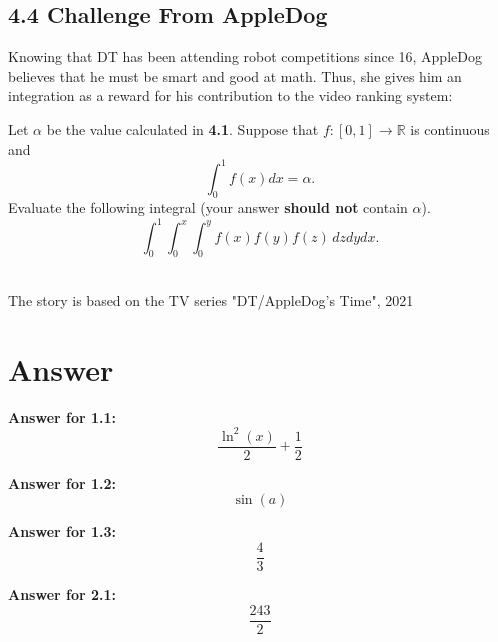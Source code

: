 \documentclass[12pt]{article}
\renewcommand{\emph}[1]{{\color{Turquoise3}\textsl{#1}}}
\begin{document}
\subsection*{4.4 Challenge From AppleDog}
\par Knowing that DT has been attending robot competitions since 16, AppleDog believes that he must be smart and good at math. Thus, she gives him an integration as a reward for his contribution to the video ranking system: 
\par Let \emph{$\alpha$} be the value calculated in \textbf{4.1}. Suppose that $f:[0,1] \to \mathbb{R}$ is continuous and 
\begin{equation*}
    \int_0^1 f(x) dx = \alpha. 
\end{equation*}
Evaluate the following integral (your answer \textbf{should not} contain \emph{$\alpha$}). 
\begin{equation*}
    \int_0^1 \int_0^x \int_0^y f(x)f(y)f(z)\,dzdydx. 
\end{equation*} 
~\\ 

\begin{flushright}
    The story is based on the TV series "DT/AppleDog's Time", 2021
\end{flushright}


\newpage
\section*{Answer}

\par \textbf{Answer for 1.1: }
\begin{equation*}
    \frac{\ln^2(x)}{2} + \frac{1}{2}
\end{equation*}

\par \textbf{Answer for 1.2: }
\begin{equation*}
    \sin(a)
\end{equation*}

\par \textbf{Answer for 1.3: }
\begin{equation*}
    \frac{4}{3}
\end{equation*}

\par \textbf{Answer for 2.1: }
\begin{equation*}
    \frac{243}{2}
\end{equation*}
\end{document}
